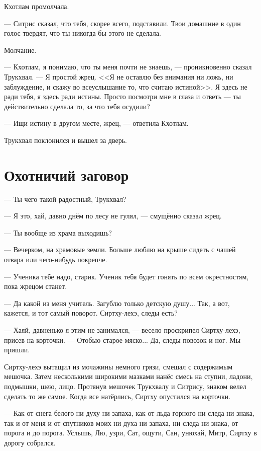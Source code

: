 \documentclass[a4paper,10pt,fleqn]{book}\usepackage{cooltooltips}\usepackage{polyglossia}\setdefaultlanguage{english}\setotherlanguage{russian}\defaultfontfeatures{Ligatures=TeX,Mapping=tex-text} \usepackage{xcolor}\definecolor{lightgray}{HTML}{bbbbbb}\color{lightgray}\newcommand{\ml}[3]{\textcolor{black}{#3}}
\begin{document}
Кхотлам промолчала.

--- Ситрис сказал, что тебя, скорее всего, подставили.
Твои домашние в один голос твердят, что ты никогда бы этого не сделала.

Молчание.

--- Кхотлам, я понимаю, что ты меня почти не знаешь, --- проникновенно сказал Трукхвал.
--- Я простой жрец.
<<Я не оставлю без внимания ни ложь, ни заблуждение, и скажу во всеуслышание то, что считаю истиной>>.
Я здесь не ради тебя, я здесь ради истины.
Просто посмотри мне в глаза и ответь --- ты действительно сделала то, за что тебя осудили?

--- Ищи истину в другом месте, жрец, --- ответила Кхотлам.

Трукхвал поклонился и вышел за дверь.

\section{Охотничий заговор}

--- Ты чего такой радостный, Трукхвал?

--- Я это, хай, давно днём по лесу не гулял, --- смущённо сказал жрец.

--- Ты вообще из храма выходишь?

--- Вечерком, на храмовые земли.
Больше люблю на крыше сидеть с чашей отвара или чего-нибудь покрепче.

--- Ученика тебе надо, старик.
Ученик тебя будет гонять по всем окрестностям, пока жрецом станет.

--- Да какой из меня учитель.
Загублю только детскую душу...
Так, а вот, кажется, и тот самый поворот.
Сиртху-лехэ, следы есть?

--- Хаяй, давненько я этим не занимался, --- весело проскрипел Сиртху-лехэ, присев на корточки.
--- Отобью старое мяско...
Да, следы повозок и ног.
Мы пришли.

Сиртху-лехэ вытащил из мочажины немного грязи, смешал с содержимым мешочка.
Затем несколькими широкими мазками нанёс смесь на ступни, ладони, подмышки, шею, лицо.
Протянув мешочек Трукхвалу и Ситрису, знаком велел сделать то же самое.
Когда все натёрлись, Сиртху опустился на корточки.

--- Как от снега белого ни духу ни запаха, как от льда горного ни следа ни знака, так и от меня и от спутников моих ни духа ни запаха, ни следа ни знака, от порога и до порога.
Услышь, Лю, узри, Сат, ощути, Сан, унюхай, Митр, Сиртху в дорогу собрался.
\end{document}
